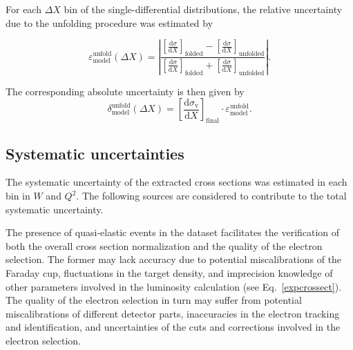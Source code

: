 \documentclass[prc,twocolumn,superscriptaddress,showpacs,amssymb,amsmath,amsfonts,aps,nofootinbib]{revtex4-1}
\begin{document}
For each $\Delta X$ bin of the single-differential distributions, the relative uncertainty due to the unfolding procedure was estimated by

\begin{equation}
\varepsilon^{\text{unfold}}_{\text{model}} (\Delta X) = \left |\dfrac{\left [ \frac{\textrm{d}\sigma}{\textrm{d}X} \right ]_{\text{folded}} - \left [ \frac{\textrm{d}\sigma}{\textrm{d}X} \right ]_{\text{unfolded}}}{\left [ \frac{\textrm{d}\sigma}{\textrm{d}X} \right ]_{\text{folded}} + \left [ \frac{\textrm{d}\sigma}{\textrm{d}X} \right ]_{\text{unfolded}}} \right |.
\label{eq:rel_mod_err_fermi}
\end{equation}

The corresponding absolute uncertainty is then given by
\begin{equation}
\delta^{\text{unfold}}_{\text{model}} (\Delta X) = \left [ \frac{\textrm{d}\sigma_{\text{v}}}{\textrm{d}X} \right ]_{\text{final}}\!\! \cdot \varepsilon^{\text{unfold}}_{\text{model}}.
\label{eq:error_stat_mod_fermi}
\end{equation}




\subsection{Systematic uncertainties}
\label{Sect:sys_uncert}

The systematic uncertainty of the extracted cross sections was estimated in each bin in $W$ and $Q^{2}$. The following sources are considered to contribute to the total systematic uncertainty.


The presence of quasi-elastic events in the dataset facilitates the verification of both the overall cross section normalization and the quality of the electron selection. The former may lack accuracy due to potential miscalibrations of the Faraday cup, fluctuations in the target density, and imprecision knowledge of other parameters involved in the luminosity calculation (see Eq.\!~\eqref{expcrossect}). The quality of the electron selection in turn may suffer from potential miscalibrations of different detector parts, inaccuracies in the electron tracking and identification, and uncertainties of the cuts and corrections involved in the electron selection.
\end{document}
